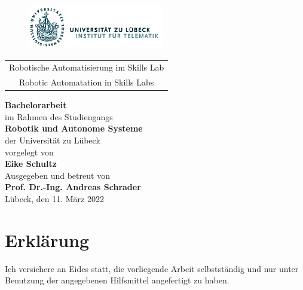 \documentclass[12pt,a4paper,%
	             twoside,   %
	             openright, %
               titlepage,
               DIV12,
               pagesize=dvips,%
               headinclude,
               footinclude=false,%
               cleardoublepage=empty,%
               parskip=half,      %
               ]{scrbook}
\begin{document}
\setcounter{page}{1}

\begin{titlepage}
{

\begin{figure}[h]
\includegraphics[width=(0.4\textwidth)]{Bilder/ITM-Weblogo.png}
\end{figure}
\vfill

\large \sffamily
{\centering\begin{tabular}{c} \toprule
\LARGE Robotische Automatisierung im Skills Lab \\
\large Robotic Automatation in Skills Labs \\ 
\bottomrule
\end{tabular}\par}
\vspace{12ex}
\large%

\noindent
\textbf{Bachelorarbeit}\\[3ex]
im Rahmen des Studiengangs\\
\textbf{Robotik und Autonome Systeme}\\
der Universität zu Lübeck\\[6ex]

vorgelegt von\\
\textbf{Eike Schultz}\\[3ex]
Ausgegeben und betreut von\\
\textbf{Prof. Dr.-Ing. Andreas Schrader}\\[6ex]

Lübeck, den 11. März 2022
}
\end{titlepage}

\chapter*{Erklärung}

Ich versichere an Eides statt, die vorliegende Arbeit selbstständig und nur unter Benutzung der angegebenen Hilfsmittel angefertigt zu haben.
\vfill
\hline
\end{document}
